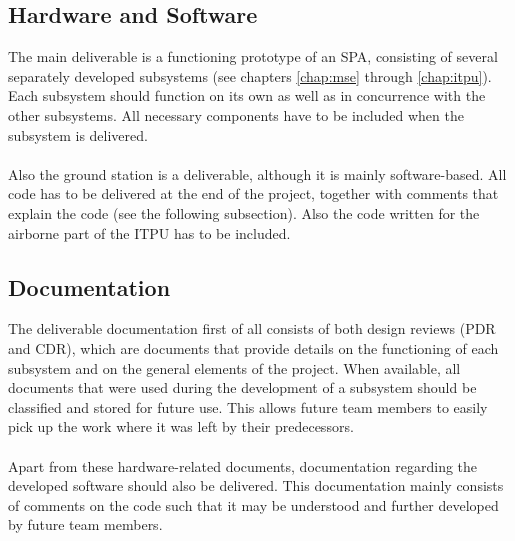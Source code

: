 \subsection{Hardware and Software}

The main deliverable is a functioning prototype of an \ac{SPA}, consisting of several separately developed subsystems (see chapters \ref{chap:mse} through \ref{chap:itpu}). Each subsystem should function on its own as well as in concurrence with the other subsystems. All necessary components have to be included when the subsystem is delivered.
\\
\\
Also the ground station is a deliverable, although it is mainly software-based. All code has to be delivered at the end of the project, together with comments that explain the code (see the following subsection). Also the code written for the airborne part of the \ac{ITPU} has to be included.

\subsection{Documentation}

The deliverable documentation first of all consists of both design reviews (\ac{PDR} and \ac{CDR}), which are documents that provide details on the functioning of each subsystem and on the general elements of the project. When available, all documents that were used during the development of a subsystem should be classified and stored for future use. This allows future team members to easily pick up the work where it was left by their predecessors.
\\
\\
Apart from these hardware-related documents, documentation regarding the developed software should also be delivered. This documentation mainly consists of comments on the code such that it may be understood and further developed by future team members.